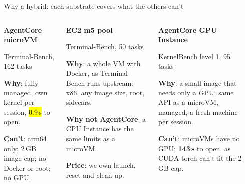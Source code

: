 \begin{frame}{Why a hybrid: each substrate covers what the others can't}
\begin{columns}[T]
\colorbox{panel}{\parbox[t][38mm]{\dimexpr\linewidth-2\fboxsep}{\raggedright\vspace{1mm}\scriptsize
{\footnotesize\bfseries\textcolor{cat2}{AgentCore microVM}}\par
{\tiny\textcolor{inkmuted}{Terminal-Bench, 162 tasks}}\par\vspace{1mm}
\textbf{Why}: fully managed, own kernel per session, \hl{0.9\,s} to open.\par\vspace{1mm}
\textbf{Can't}: arm64 only; 2\,GB image cap; no Docker or root; no GPU.}}
\colorbox{panel}{\parbox[t][38mm]{\dimexpr\linewidth-2\fboxsep}{\raggedright\vspace{1mm}\scriptsize
{\footnotesize\bfseries\textcolor{cat1}{EC2 m5 pool}}\par
{\tiny\textcolor{inkmuted}{Terminal-Bench, 50 tasks}}\par\vspace{1mm}
\textbf{Why}: a whole VM with Docker, as Terminal-Bench runs upstream: x86, any image size, root, sidecars.\par\vspace{1mm}
\textbf{Why not AgentCore}: a CPU Instance has the same limits as a microVM.\par\vspace{1mm}
\textbf{Price}: we own launch, reset and clean-up.}}
\colorbox{panel}{\parbox[t][38mm]{\dimexpr\linewidth-2\fboxsep}{\raggedright\vspace{1mm}\scriptsize
{\footnotesize\bfseries\textcolor{cat3}{AgentCore GPU Instance}}\par
{\tiny\textcolor{inkmuted}{KernelBench level 1, 95 tasks}}\par\vspace{1mm}
\textbf{Why}: a small image that needs only a GPU; same API as a microVM, managed, a fresh machine per session.\par\vspace{1mm}
\textbf{Can't}: microVMs have no GPU; \textbf{143\,s} to open, as CUDA torch can't fit the 2\,GB cap.}}
\colorbox{panel}{\parbox[t][38mm]{\dimexpr\linewidth-2\fboxsep}{\raggedright\vspace{1mm}\scriptsize
}}
\end{columns}
\end{frame}
